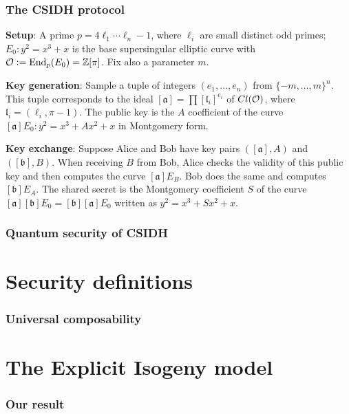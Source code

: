 \documentclass{beamer}
\begin{document}
    \begin{frame}
        \frametitle{The CSIDH protocol}
        
        \begin{block}{}
            \textbf{Setup}: A prime $p=4\ell_1\cdots\ell_n-1$, where $\ell_i$ are small distinct odd primes; $E_0:y^2=x^3+x$ is the base supersingular elliptic curve with $\mathcal{O}:=\operatorname{End}_p(E_0)=\mathbb{Z}[\pi]$. Fix also a parameter $m$.
            
            \textbf{Key generation}: Sample a tuple of integers $(e_1,\dots,e_n)$ from $\{ -m,\dots,m \}^n$. This tuple corresponds to the ideal $[\mathfrak{a}] = \prod [\mathfrak{l}_i]^{e_i}$ of $Cl(\mathcal{O})$, where $\mathfrak{l}_i=(\ell_i, \pi-1)$. The public key is the $A$ coefficient of the curve $[\mathfrak{a}]E_0:y^2=x^3+Ax^2+x$ in Montgomery form.
            
            \textbf{Key exchange}: Suppose Alice and Bob have key pairs $([\mathfrak{a}], A)$ and $([\mathfrak{b}], B)$. When receiving $B$ from Bob, Alice checks the validity of this public key and then computes the curve $[\mathfrak{a}]E_B$. Bob does the same and computes $[\mathfrak{b}]E_A$. The shared secret is the Montgomery coefficient $S$ of the curve $[\mathfrak{a}][\mathfrak{b}]E_0=[\mathfrak{b}][\mathfrak{a}]E_0$ written as $y^2=x^3+Sx^2+x$.
        \end{block}
    
    \end{frame}

    \begin{frame}
        \frametitle{Quantum security of CSIDH}
    
    \end{frame}


    
    
    \section{Security definitions}
    
    \begin{frame}
        \frametitle{}
    
    \end{frame}

    \begin{frame}
        \frametitle{}
    
    \end{frame}
    
    \begin{frame}
        \frametitle{Universal composability}
    \end{frame}

    
    \section{The Explicit Isogeny model}
        
    \begin{frame}
        \frametitle{Our result}
    \end{frame}
\end{document}
